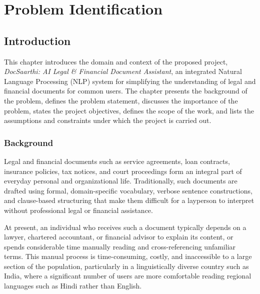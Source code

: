 
\chapter{Problem Identification}

\section{Introduction}

This chapter introduces the domain and context of the proposed project, \textit{DocSaarthi: AI Legal \& Financial Document Assistant}, an integrated Natural Language Processing (NLP) system for simplifying the understanding of legal and financial documents for common users. The chapter presents the background of the problem, defines the problem statement, discusses the importance of the problem, states the project objectives, defines the scope of the work, and lists the assumptions and constraints under which the project is carried out.


\subsection{Background}

Legal and financial documents such as service agreements, loan contracts, insurance policies, tax notices, and court proceedings form an integral part of everyday personal and organizational life. Traditionally, such documents are drafted using formal, domain-specific vocabulary, verbose sentence constructions, and clause-based structuring that make them difficult for a layperson to interpret without professional legal or financial assistance.

At present, an individual who receives such a document typically depends on a lawyer, chartered accountant, or financial advisor to explain its content, or spends considerable time manually reading and cross-referencing unfamiliar terms. This manual process is time-consuming, costly, and inaccessible to a large section of the population, particularly in a linguistically diverse country such as India, where a significant number of users are more comfortable reading regional languages such as Hindi rather than English.

